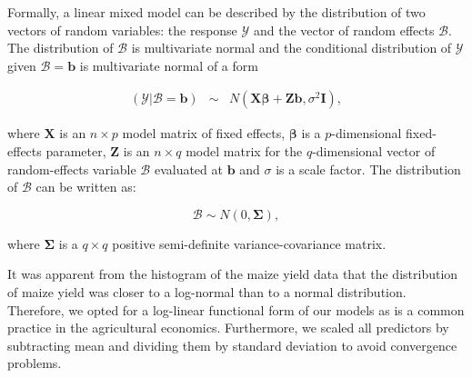 \documentclass[12pt]{iopart}
\begin{document}
Formally, a linear mixed model can be described by the distribution of two vectors of random variables: the response $\mathscr{Y}$ and the vector of random effects $\mathscr{B}$. The distribution of $\mathscr{B}$ is multivariate normal and the conditional distribution of $\mathscr{Y}$ given $\mathscr{B}=\mathbf{b}$ is multivariate normal of a form %




\begin{equation}\label{MixedGeneral}
\begin{array}{lcl}

(\mathscr{Y}|\mathscr{B}=\mathbf{b})& \sim & \mathit{N}(\mathbf{X}\mathbf{\beta}+\mathbf{Z}\mathbf{b},\sigma^2\mathbf{I}),

\end{array}
\end{equation}

where $\mathbf{X}$ is an $n \times p$ model matrix of fixed effects, $\mathbf{\beta}$ is a $p$-dimensional fixed-effects parameter, $\mathbf{Z}$ is an $n \times q$ model matrix for the $q$-dimensional vector of random-effects variable $\mathscr{B}$ evaluated at $\mathbf{b}$ and $\sigma$ is a scale factor. The distribution of $\mathscr{B}$ can be written as: 

\begin{equation}\label{ranefDist}
\mathscr{B} \sim \mathit{N}(0,\mathbf{\Sigma}),
\end{equation}

where $\mathbf{\Sigma}$ is a $q \times q$ positive semi-definite variance-covariance matrix.





It was apparent from the histogram of the maize yield data that the distribution of maize yield was closer to a log-normal than to a normal distribution. Therefore, we opted for a log-linear functional form of our models as is a common practice in the agricultural economics. Furthermore, we scaled all predictors by subtracting mean and dividing them by standard deviation to avoid convergence problems.
\end{document}
